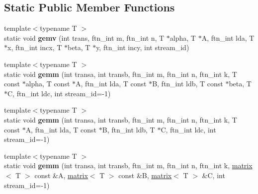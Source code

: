 \subsection*{Static Public Member Functions}
\begin{DoxyCompactItemize}
\item 
\hypertarget{classsddk_1_1linalg_3_01_g_p_u_01_4_a8c47450c1b8d490dcd77200854dff231}{}{\footnotesize template$<$typename T $>$ }\\static void {\bfseries gemv} (int trans, ftn\+\_\+int m, ftn\+\_\+int n, T $\ast$alpha, T $\ast$A, ftn\+\_\+int lda, T $\ast$x, ftn\+\_\+int incx, T $\ast$beta, T $\ast$y, ftn\+\_\+int incy, int stream\+\_\+id)\label{classsddk_1_1linalg_3_01_g_p_u_01_4_a8c47450c1b8d490dcd77200854dff231}

\item 
\hypertarget{classsddk_1_1linalg_3_01_g_p_u_01_4_a197b85f4ea5beb726cd557d076caae33}{}{\footnotesize template$<$typename T $>$ }\\static void {\bfseries gemm} (int transa, int transb, ftn\+\_\+int m, ftn\+\_\+int n, ftn\+\_\+int k, T const $\ast$alpha, T const $\ast$A, ftn\+\_\+int lda, T const $\ast$B, ftn\+\_\+int ldb, T const $\ast$beta, T $\ast$C, ftn\+\_\+int ldc, int stream\+\_\+id=-\/1)\label{classsddk_1_1linalg_3_01_g_p_u_01_4_a197b85f4ea5beb726cd557d076caae33}

\item 
\hypertarget{classsddk_1_1linalg_3_01_g_p_u_01_4_ae4fd03e4c07c38d25fbeef322f0b56f6}{}{\footnotesize template$<$typename T $>$ }\\static void {\bfseries gemm} (int transa, int transb, ftn\+\_\+int m, ftn\+\_\+int n, ftn\+\_\+int k, T const $\ast$A, ftn\+\_\+int lda, T const $\ast$B, ftn\+\_\+int ldb, T $\ast$C, ftn\+\_\+int ldc, int stream\+\_\+id=-\/1)\label{classsddk_1_1linalg_3_01_g_p_u_01_4_ae4fd03e4c07c38d25fbeef322f0b56f6}

\item 
\hypertarget{classsddk_1_1linalg_3_01_g_p_u_01_4_a2e89448a1aacdfa7694bc72e7a56310c}{}{\footnotesize template$<$typename T $>$ }\\static void {\bfseries gemm} (int transa, int transb, ftn\+\_\+int m, ftn\+\_\+int n, ftn\+\_\+int k, \hyperlink{classsddk_1_1mdarray}{matrix}$<$ T $>$ const \&A, \hyperlink{classsddk_1_1mdarray}{matrix}$<$ T $>$ const \&B, \hyperlink{classsddk_1_1mdarray}{matrix}$<$ T $>$ \&C, int stream\+\_\+id=-\/1)\label{classsddk_1_1linalg_3_01_g_p_u_01_4_a2e89448a1aacdfa7694bc72e7a56310c}


\end{DoxyCompactItemize}
